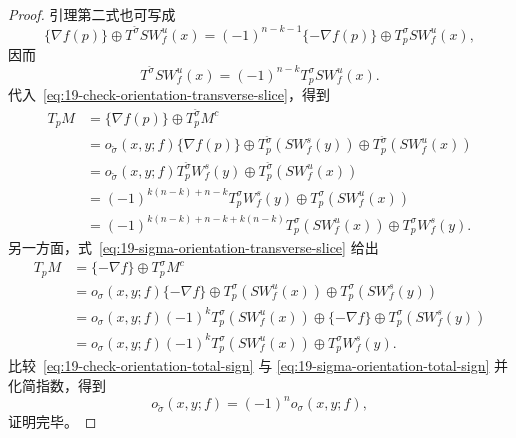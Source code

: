 \begin{proof}
引理第二式也可写成
\[
 \{\nabla f(p)\}\oplus T^{\check\sigma}S W_f^u(x)
 =(-1)^{n-k-1}\{-\nabla f(p)\}\oplus T_p^\sigma S W_f^u(x),
\]
因而
\[
 T^{\check\sigma}S W_f^u(x)=(-1)^{n-k}T_p^\sigma S W_f^u(x).
\]
代入~\eqref{eq:19-check-orientation-transverse-slice}，得到
\begin{equation}
\begin{aligned}
 T_pM
 &=\{\nabla f(p)\}\oplus T_p^{\check\sigma}M^c\\
 &=o_{\check\sigma}(x,y;f)\{\nabla f(p)\}
 \oplus T_p^{\check\sigma}(S W_f^s(y))
 \oplus T_p^{\check\sigma}(S W_f^u(x))\\
 &=o_{\check\sigma}(x,y;f)T_p^{\check\sigma}W_f^s(y)
 \oplus T_p^{\check\sigma}(S W_f^u(x))\\
 &=(-1)^{k(n-k)+n-k}T_p^\sigma W_f^s(y)
 \oplus T_p^\sigma(S W_f^u(x))\\
 &=(-1)^{k(n-k)+n-k+k(n-k)}T_p^\sigma(S W_f^u(x))
 \oplus T_p^\sigma W_f^s(y).
\end{aligned}
\label{eq:19-check-orientation-total-sign}
\end{equation}
另一方面，式~\eqref{eq:19-sigma-orientation-transverse-slice} 给出
\begin{equation}
\begin{aligned}
 T_pM
 &=\{-\nabla f\}\oplus T_p^\sigma M^c\\
 &=o_\sigma(x,y;f)\{-\nabla f\}\oplus T_p^\sigma(S W_f^u(x))
 \oplus T_p^\sigma(S W_f^s(y))\\
 &=o_\sigma(x,y;f)(-1)^kT_p^\sigma(S W_f^u(x))
 \oplus\{-\nabla f\}\oplus T_p^\sigma(S W_f^s(y))\\
 &=o_\sigma(x,y;f)(-1)^kT_p^\sigma(S W_f^u(x))
 \oplus T_p^\sigma W_f^s(y).
\end{aligned}
\label{eq:19-sigma-orientation-total-sign}
\end{equation}
比较~\eqref{eq:19-check-orientation-total-sign} 与
\eqref{eq:19-sigma-orientation-total-sign} 并化简指数，得到
\[
 o_{\check\sigma}(x,y;f)=(-1)^no_\sigma(x,y;f),
\]
证明完毕。
\end{proof}

